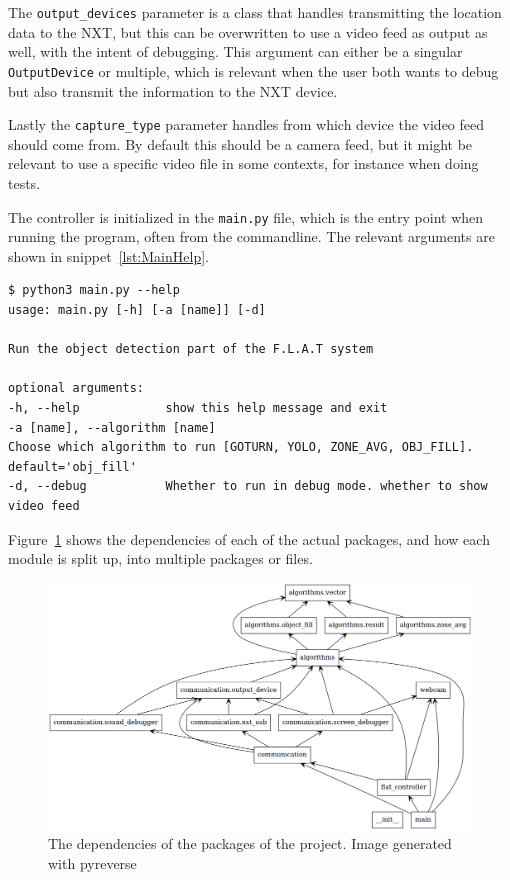 The \texttt{output\_devices} parameter is a class that handles transmitting the location data to the NXT, but this can be overwritten to use a video feed as output as well, with the intent of debugging. 
This argument can either be a singular \texttt{OutputDevice} or multiple, which is relevant when the user both wants to debug but also transmit the information to the NXT device.


Lastly the \texttt{capture\_type} parameter handles from which device the video feed should come from.
By default this should be a camera feed, but it might be relevant to use a specific video file in some contexts, for instance when doing tests.


The controller is initialized in the \texttt{main.py} file, which is the entry point when running the program, often from the commandline. The relevant arguments are shown in snippet~\ref{lst:MainHelp}.
\begin{lstlisting}[label={lst:MainHelp},caption={The help message of the commandline interface}]
$ python3 main.py --help
usage: main.py [-h] [-a [name]] [-d]

Run the object detection part of the F.L.A.T system

optional arguments:
-h, --help            show this help message and exit
-a [name], --algorithm [name]
Choose which algorithm to run [GOTURN, YOLO, ZONE_AVG, OBJ_FILL]. default='obj_fill'
-d, --debug           Whether to run in debug mode. whether to show video feed
\end{lstlisting}
Figure~\ref{fig:pythonClasses} shows the dependencies of each of the actual packages, and how each module is split up, into multiple packages or files.

\begin{figure}[H]
	\centering
	\includegraphics[width=\textwidth]{5.Solution/images/python_packages.png}
	\caption{The dependencies of the packages of the project{.} Image generated with pyreverse\cite{pyreverse}}
	\label{fig:pythonClasses}
\end{figure}



